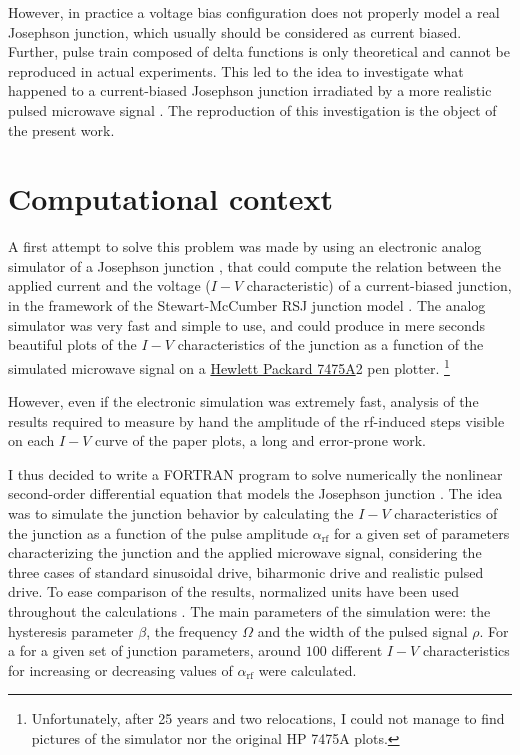 However, in practice a voltage bias configuration does not properly model a real Josephson junction, which usually should be considered as current biased.
Further, pulse train composed of delta functions is only theoretical and cannot be reproduced in actual experiments. 
This led to the idea to investigate what happened to a current-biased Josephson junction irradiated by a more realistic pulsed microwave signal \cite{Maggi:1996, Maggi:1997}. 
The reproduction of this investigation is the object of the present work.



\section{Computational context}
\label{computational-context}

A first attempt to solve this problem was made by using an electronic analog simulator of a Josephson junction \cite {Henry:1981}, that could compute the relation between the applied current and the voltage ($I-V$ characteristic) of a current-biased junction, in the framework of the Stewart-McCumber RSJ junction model \cite{McCumber:1968, Stewart:1974}.
The analog simulator was very fast and simple to use, and could produce in mere seconds beautiful plots of the $I-V$ characteristics of the junction as a function of the simulated microwave signal on a \href{http://www.hpmuseum.net/display_item.php?hw=74}{Hewlett Packard 7475A}2 pen plotter.
\footnote{Unfortunately, after 25 years and two relocations, I could not manage to find pictures of the simulator nor the original HP 7475A plots.} 

However, even if the electronic simulation was extremely fast, analysis of the results required to measure by hand the amplitude of the rf-induced steps visible on each $I-V$ curve of the paper plots, a long and error-prone work.

I thus decided to write a FORTRAN program to solve numerically the nonlinear second-order differential equation that models the Josephson junction \cite{McCumber:1968, Stewart:1974}. 
The idea was to simulate the junction behavior by calculating the $I-V$ characteristics of the junction as a function of the pulse amplitude $\alpha_\mathrm{rf}$ for a given set of parameters characterizing the junction and the applied microwave signal, considering the three cases of standard sinusoidal drive, biharmonic drive and realistic pulsed drive. 
To ease comparison of the results, normalized units have been used throughout the calculations \cite{McCumber:1968, Stewart:1974}.
The main parameters of the simulation were: the hysteresis parameter $\beta$, the frequency $\Omega$ and the width of the pulsed signal $\rho$. 
For a for a given set of junction parameters, around $100$ different $I-V$ characteristics for increasing or decreasing values of $\alpha_\mathrm{rf}$ were calculated.

